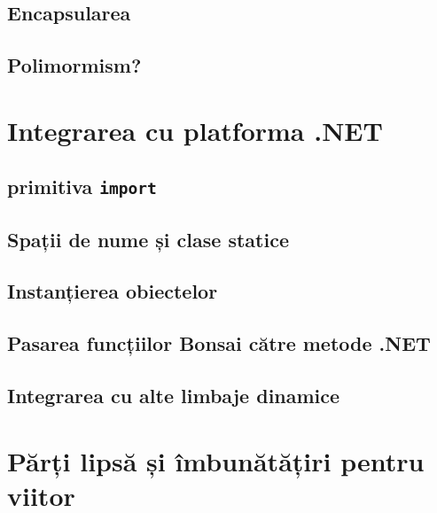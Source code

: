 \documentclass[12pt,a4paper]{memoir}
\begin{document}

\section{Encapsularea}


\section{Polimormism?}


\chapter{Integrarea cu platforma .NET}

\section{primitiva \texttt{import}}

\section{Spații de nume și clase statice}

\section{Instanțierea obiectelor}

\section{Pasarea funcțiilor Bonsai către metode .NET}

\section{Integrarea cu alte limbaje dinamice}

\chapter{Părți lipsă și îmbunătățiri pentru viitor}
\end{document}
